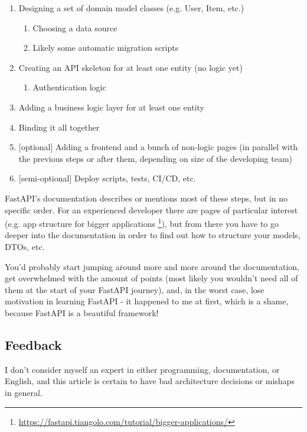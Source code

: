 \documentclass[14pt]{extarticle}
\begin{document}
\begin{enumerate}
    \item Designing a set of domain model classes (e.g. User, Item, etc.)
        \begin{enumerate}
            \item Choosing a data source
            \item Likely some automatic migration scripts
        \end{enumerate}
    \item Creating an API skeleton for at least one entity (no logic yet)
        \begin{enumerate}
            \item Authentication logic
        \end{enumerate}
    \item Adding a business logic layer for at least one entity
    \item Binding it all together
    \item {[optional]} Adding a frontend and a bunch of non-logic pages (in parallel with the previous steps or after them, depending on size of the developing team)
    \item {[semi-optional]} Deploy scripts, tests, CI/CD, etc.
\end{enumerate}

FastAPI's documentation describes or mentions most of these steps, but in no specific order. For an experienced developer there are pages of particular interest (e.g. app structure for bigger applications \footnote{\href{https://fastapi.tiangolo.com/tutorial/bigger-applications/}{https://fastapi.tiangolo.com/tutorial/bigger-applications/}}), but from there you have to go deeper into the documentation in order to find out how to structure your models, DTOs, etc.

You'd probably start jumping around more and more around the documentation, get overwhelmed with the amount of points (most likely you wouldn't need all of them at the start of your FastAPI journey), and, in the worst case, lose motivation in learning FastAPI - it happened to me at first, which is a shame, because FastAPI is a beautiful framework!

\subsection{Feedback}

I don't consider myself an expert in either programming, documentation, or English, and this article is certain to have bad architecture decisions or mishaps in general.
\end{document}
